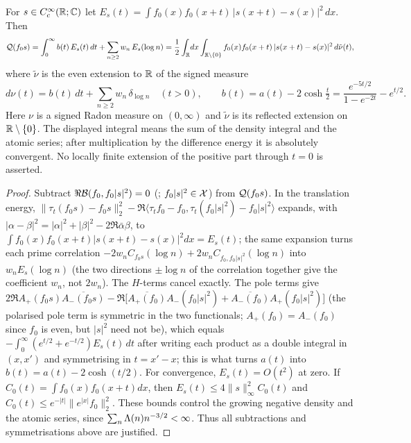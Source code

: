 \begin{theorem}\label{thm:GS}
For $s\in C_c^\infty(\mathbb R;\mathbb C)$ let $E_s(t)=\int f_0(x)f_0(x+t)\,|s(x+t)-s(x)|^2\,dx$. Then
\begin{equation}\label{eq:GS}
 \mathcal Q(f_0s)=\int_0^\infty b(t)\,E_s(t)\,dt+\sum_{n\ge2}w_n\,E_s(\log n)
        =\frac12\int_{\mathbb R}\!dx\int_{\mathbb R\setminus\{0\}}f_0(x)f_0(x+t)\,|s(x+t)-s(x)|^2\,d\tilde\nu(t),
\end{equation}
where $\tilde\nu$ is the even extension to $\mathbb R$ of the signed measure
\begin{equation}\label{eq:nu}
 d\nu(t)=b(t)\,dt+\sum_{n\ge2}w_n\,\delta_{\log n}\quad(t>0),\qquad
 b(t)=a(t)-2\cosh\tfrac t2=\frac{e^{-5t/2}}{1-e^{-2t}}-e^{t/2}.
\end{equation}
Here $\nu$ is a signed Radon measure on $(0,\infty)$ and
$\tilde\nu$ is its reflected extension on $\mathbb R\setminus\{0\}$.
The displayed integral means the sum of the density integral and the
atomic series; after multiplication by the difference energy it is
absolutely convergent. No locally finite extension of the positive
part through $t=0$ is asserted.
\end{theorem}
\begin{proof}
Subtract $\Re\mathcal B(f_0,f_0|s|^2)=0$ (; $f_0|s|^2\in\mathcal X$) from $\mathcal Q(f_0s)$. In the translation energy,
$\|\tau_t(f_0s)-f_0s\|_2^2-\Re\langle\tau_t f_0-f_0,\tau_t(f_0|s|^2)-f_0|s|^2\rangle$ expands, with $|\alpha-\beta|^2=|\alpha|^2+|\beta|^2-2\Re\bar\alpha\beta$,
to $\int f_0(x)f_0(x+t)|s(x+t)-s(x)|^2dx=E_s(t)$; the same expansion turns each prime correlation $-2w_nC_{f_0s}(\log n)+2w_nC_{f_0,f_0|s|^2}(\log n)$
into $w_nE_s(\log n)$ (the two directions $\pm\log n$ of the correlation together give the coefficient $w_n$, not $2w_n$). The
$H$-terms cancel exactly. The pole terms give $2\Re A_+(f_0s)\overline{A_-(f_0s)}-\Re\bigl[\overline{A_+(f_0)}A_-(f_0|s|^2)+\overline{A_-(f_0)}A_+(f_0|s|^2)\bigr]$
(the polarised pole term is symmetric in the two functionals; $A_+(f_0)=A_-(f_0)$ since $f_0$ is even, but $|s|^2$ need not be), which equals
$-\int_0^\infty(e^{t/2}+e^{-t/2})E_s(t)\,dt$ after writing each product as a double integral in $(x,x')$ and symmetrising in $t=x'-x$; this is what turns
$a(t)$ into $b(t)=a(t)-2\cosh(t/2)$. For convergence, $E_s(t)=O(t^2)$ at zero. If
$C_0(t)=\int f_0(x)f_0(x+t)dx$, then
$E_s(t)\le4\|s\|_\infty^2C_0(t)$ and
$C_0(t)\le e^{-|t|}\|e^{|x|}f_0\|_2^2$.
These bounds control the growing negative density and the atomic
series, since $\sum_n\Lambda(n)n^{-3/2}<\infty$.
Thus all subtractions and symmetrisations above are justified.
\end{proof}

